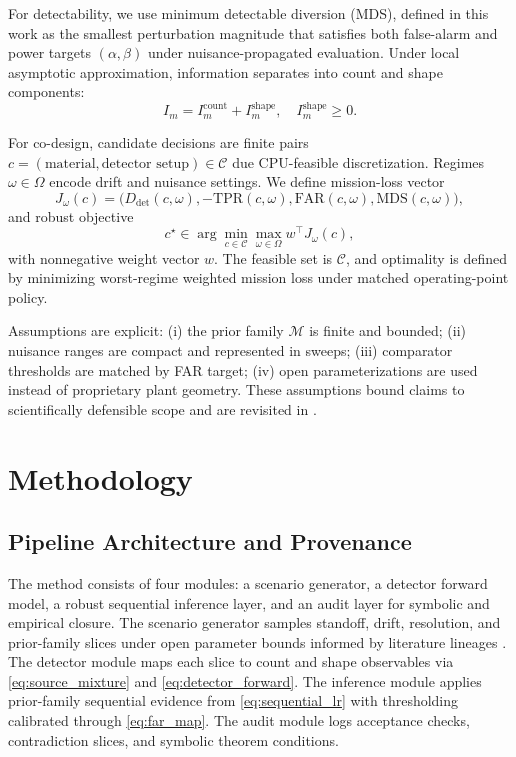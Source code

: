For detectability, we use minimum detectable diversion (MDS), defined in this work as the smallest perturbation magnitude that satisfies both false-alarm and power targets $(\alpha,\beta)$ under nuisance-propagated evaluation. Under local asymptotic approximation, information separates into count and shape components:
\begin{equation}
I_m = I_m^{\mathrm{count}} + I_m^{\mathrm{shape}}, \quad I_m^{\mathrm{shape}}\ge 0.
\label{eq:info_decomp}
\end{equation}

For co-design, candidate decisions are finite pairs $c=(\text{material},\text{detector setup})\in\mathcal{C}$ due CPU-feasible discretization. Regimes $\omega\in\Omega$ encode drift and nuisance settings. We define mission-loss vector
\begin{equation}
J_\omega(c)=\big(D_{\mathrm{det}}(c,\omega),-\mathrm{TPR}(c,\omega),\mathrm{FAR}(c,\omega),\mathrm{MDS}(c,\omega)\big),
\label{eq:mission_vector}
\end{equation}
and robust objective
\begin{equation}
c^\star \in \arg\min_{c\in\mathcal{C}}\max_{\omega\in\Omega} w^\top J_\omega(c),
\label{eq:robust_objective}
\end{equation}
with nonnegative weight vector $w$. The feasible set is $\mathcal{C}$, and optimality is defined by minimizing worst-regime weighted mission loss under matched operating-point policy.

Assumptions are explicit: (i) the prior family $\mathcal{M}$ is finite and bounded; (ii) nuisance ranges are compact and represented in sweeps; (iii) comparator thresholds are matched by FAR target; (iv) open parameterizations are used instead of proprietary plant geometry. These assumptions bound claims to scientifically defensible scope and are revisited in .

\section{Methodology}\label{sec:method}
\subsection{Pipeline Architecture and Provenance}
The method consists of four modules: a scenario generator, a detector forward model, a robust sequential inference layer, and an audit layer for symbolic and empirical closure. The scenario generator samples standoff, drift, resolution, and prior-family slices under open parameter bounds informed by literature lineages \citep{SRC007,SRC010,SRC019,SRC025,SRC026,SRC028}. The detector module maps each slice to count and shape observables via \eqref{eq:source_mixture} and \eqref{eq:detector_forward}. The inference module applies prior-family sequential evidence from \eqref{eq:sequential_lr} with thresholding calibrated through \eqref{eq:far_map}. The audit module logs acceptance checks, contradiction slices, and symbolic theorem conditions.

